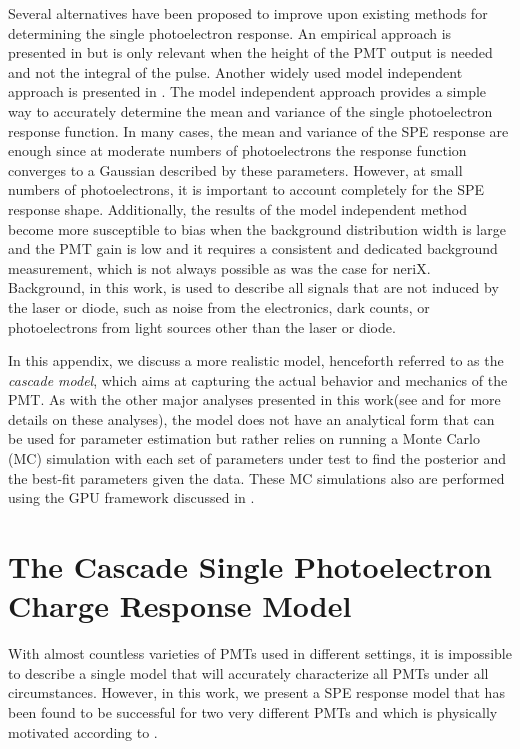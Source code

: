 Several alternatives have been proposed to improve upon existing methods for determining the single photoelectron response.  An empirical approach is presented in  but is only relevant when the height of the PMT output is needed and not the integral of the pulse.  Another widely used model independent approach is presented in .  The model independent approach provides a simple way to accurately determine the mean and variance of the single photoelectron response function.  In many cases, the mean and variance of the SPE response are  enough since at moderate numbers of photoelectrons the response function converges to a Gaussian described by these parameters.  However, at small numbers of photoelectrons, it is important to account completely for the SPE response shape.  Additionally, the results of the model independent method become more susceptible to bias when the background distribution width is large and the PMT gain is low and it requires a consistent and dedicated background measurement, which is not always possible as was the case for neriX.  Background, in this work, is used to describe all signals that are not induced by the laser or diode, such as noise from the electronics, dark counts, or photoelectrons from light sources other than the laser or diode.

In this appendix, we discuss a more realistic model, henceforth referred to as the \textit{cascade model}, which aims at capturing the actual behavior and mechanics of the PMT.  As with the other major analyses presented in this work(see  and  for more details on these analyses), the model does not have an analytical form that can be used for parameter estimation but rather relies on running a Monte Carlo (MC) simulation with each set of parameters under test to find the posterior and the best-fit parameters given the data.  These MC simulations also are performed using the GPU framework discussed in .


\section{The Cascade Single Photoelectron Charge Response Model}
\label{sec:pmt_cascade_description}

With almost countless varieties of PMTs used in different settings, it is impossible to describe a single model that will accurately characterize all PMTs under all circumstances.  However, in this work, we present a SPE response model that has been found to be successful for two very different PMTs and which is physically motivated according to .  

